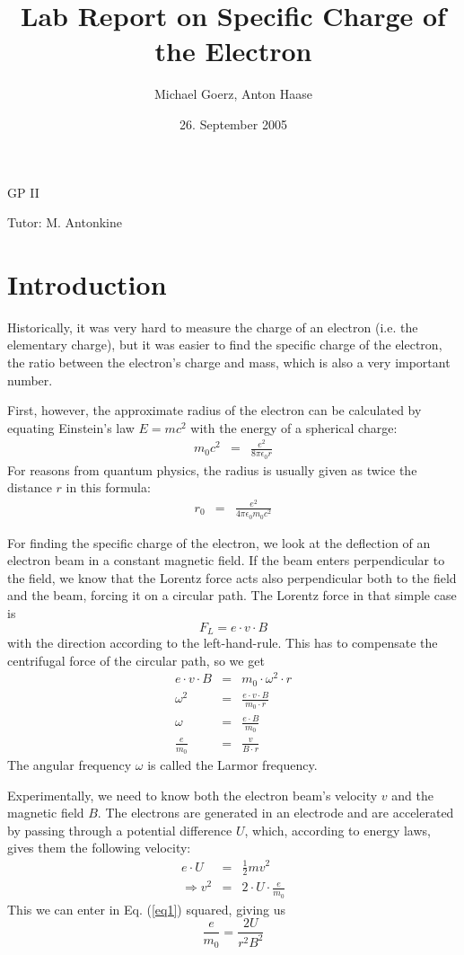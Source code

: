 \documentclass[a4paper,10pt]{article}
\title{Lab Report on Specific Charge of the Electron}
\author{Michael Goerz, Anton Haase}
\date{26. September 2005}
\begin{document}
\maketitle
\noindent GP II

\noindent Tutor: M. Antonkine

\section{Introduction}
Historically, it was very hard to measure the charge of an electron (i.e. the elementary charge), but it was easier to find the specific charge of the electron, the ratio between the electron's charge and mass, which is also a very important number.

First, however, the approximate radius of the electron can be calculated by equating Einstein's law $E=mc^2$ with the energy of a spherical charge:
\begin{eqnarray}
m_0 c^2 &=& \frac{e^2}{8 \pi \epsilon_0 r}
\end{eqnarray}
For reasons from quantum physics, the radius is usually given as twice the distance $r$ in this formula:
\begin{eqnarray}
r_0 &=& \frac{e^2}{4 \pi \epsilon_0 m_0 c^2}
\end{eqnarray}

For finding the specific charge of the electron, we look at the deflection of an electron beam in a constant magnetic field. If the beam enters perpendicular to the field, we know that the Lorentz force acts also perpendicular both to the field and the beam, forcing it on a circular path. The Lorentz force in that simple case is \begin{equation}
F_L = e \cdot v \cdot B
\end{equation}
with the direction according to the left-hand-rule. This has to compensate the centrifugal force of the circular path, so we get
\begin{eqnarray}
e \cdot v \cdot B &=& m_0 \cdot \omega^2 \cdot r \nonumber\\
\omega^2 &=& \frac{e \cdot v \cdot B}{m_0 \cdot r} \nonumber\\
\omega &=& \frac{e \cdot B}{m_0}\\
\frac{e}{m_0} &=&\frac{v}{B \cdot r} \label{eq1}
\end{eqnarray}
The angular frequency $\omega$ is called the Larmor frequency.

Experimentally, we need to know both the electron beam's velocity $v$ and the magnetic field $B$. The electrons are generated in an electrode and are accelerated by passing through a potential difference $U$, which, according to energy laws, gives them the following velocity:
\begin{eqnarray}
e \cdot U &=& \frac{1}{2}m v^2\\
\Rightarrow v^2 &=& 2 \cdot U \cdot \frac{e}{m_0}
\end{eqnarray}
This we can enter in Eq. (\ref{eq1}) squared, giving us
\begin{equation}
\frac{e}{m_0} = \frac{ 2 U}{r^2 B^2} \label{specificcharge}
\end{equation}
\end{document}

